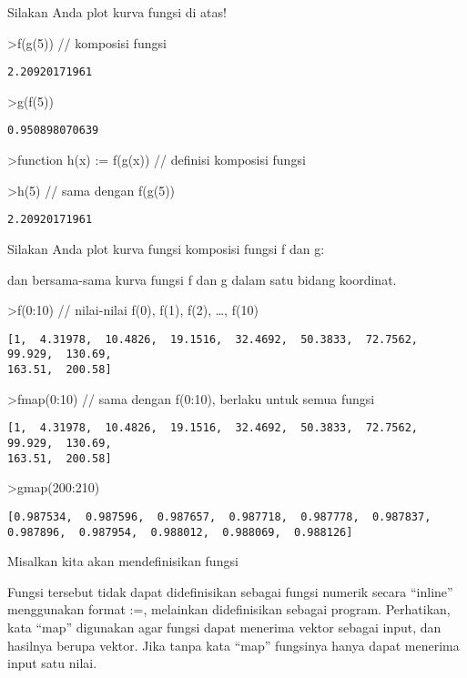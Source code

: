 \documentclass[
]{book}
\begin{document}
Silakan Anda plot kurva fungsi di atas!

\textgreater f(g(5)) // komposisi fungsi

\begin{verbatim}
2.20920171961
\end{verbatim}

\textgreater g(f(5))

\begin{verbatim}
0.950898070639
\end{verbatim}

\textgreater function h(x) := f(g(x)) // definisi komposisi fungsi

\textgreater h(5) // sama dengan f(g(5))

\begin{verbatim}
2.20920171961
\end{verbatim}

Silakan Anda plot kurva fungsi komposisi fungsi f dan g:

dan bersama-sama kurva fungsi f dan g dalam satu bidang koordinat.

\textgreater f(0:10) // nilai-nilai f(0), f(1), f(2), \ldots, f(10)

\begin{verbatim}
[1,  4.31978,  10.4826,  19.1516,  32.4692,  50.3833,  72.7562,  99.929,  130.69,
163.51,  200.58]
\end{verbatim}

\textgreater fmap(0:10) // sama dengan f(0:10), berlaku untuk semua fungsi

\begin{verbatim}
[1,  4.31978,  10.4826,  19.1516,  32.4692,  50.3833,  72.7562,  99.929,  130.69,
163.51,  200.58]
\end{verbatim}

\textgreater gmap(200:210)

\begin{verbatim}
[0.987534,  0.987596,  0.987657,  0.987718,  0.987778,  0.987837,  0.987896,  0.987954,  0.988012,  0.988069,  0.988126]
\end{verbatim}

Misalkan kita akan mendefinisikan fungsi

Fungsi tersebut tidak dapat didefinisikan sebagai fungsi numerik secara ``inline'' menggunakan format :=, melainkan didefinisikan sebagai program. Perhatikan, kata ``map'' digunakan agar fungsi dapat menerima vektor sebagai input, dan hasilnya berupa vektor. Jika tanpa kata ``map'' fungsinya hanya dapat menerima input satu nilai.
\end{document}
